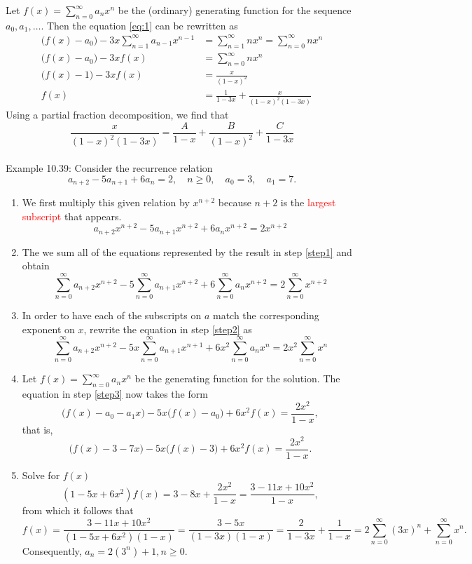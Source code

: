 \documentclass[a4paper]{article}
\begin{document}
Let $f(x)=\sum_{n=0}^{\infty}{a_nx^n}$ be the (ordinary) generating function for the sequence $a_0,a_1,\ldots$. Then the equation \ref{eq:1} can be rewritten as
\begin{align*}
    \big(f(x)-a_0\big)-3x\sum_{n=1}^{\infty}{a_{n-1}x^{n-1}}&=\sum_{n=1}^{\infty}{nx^n}=\sum_{n=0}^{\infty}{nx^n}\\
    \big(f(x)-a_0\big)-3xf(x)&=\sum_{n=0}^{\infty}{nx^n}\\
    \big(f(x)-1\big)-3xf(x)&=\frac{x}{(1-x)^2}\\
    f(x)&=\frac{1}{1-3x}+\frac{x}{(1-x)^2(1-3x)}
\end{align*}
Using a partial fraction decomposition, we find that
\begin{equation*}
    \frac{x}{(1-x)^2(1-3x)}=\frac{A}{1-x}+\frac{B}{(1-x)^2}+\frac{C}{1-3x}
\end{equation*}
\\
Example 10.39: Consider the recurrence relation
    $$
    a_{n+2}-5a_{n+1}+6a_n=2,\quad n\geq0,\quad a_0=3,\quad a_1=7.
    $$
\begin{enumerate}
    \item We first multiply this given relation by $x^{n+2}$ because $n+2$ is the \textcolor{red}{largest subscript} that appears.
    \label{step1}
    $$
    a_{n+2}x^{n+2}-5a_{n+1}x^{n+2}+6a_nx^{n+2}=2x^{n+2}
    $$
    \item The we sum all of the equations represented by the result in step \ref{step1} and obtain
    $$
    \sum_{n=0}^{\infty}{a_{n+2}x^{n+2}}-5\sum_{n=0}^{\infty}{a_{n+1}x^{n+2}}+6\sum_{n=0}^{\infty}{a_nx^{n+2}}=2\sum_{n=0}^{\infty}{x^{n+2}}
    $$
    \label{step2}
    \item In order to have each of the subscripts on $a$ match the corresponding exponent on $x$, rewrite the equation in step \ref{step2} as
    $$
    \sum_{n=0}^{\infty}{a_{n+2}x^{n+2}}-5x\sum_{n=0}^{\infty}{a_{n+1}x^{n+1}}+6x^2\sum_{n=0}^{\infty}{a_nx^{n}}=2x^2\sum_{n=0}^{\infty}{x^{n}}
    $$
    \label{step3}
    \item Let $f(x)=\sum_{n=0}^{\infty}{a_nx^n}$ be the generating function for the solution. The equation in step \ref{step3} now takes the form
    $$
    \big(f(x)-a_0-a_1x\big)-5x\big(f(x)-a_0\big)+6x^2f(x)=\frac{2x^2}{1-x},
    $$
    that is,
    $$
    \big(f(x)-3-7x\big)-5x\big(f(x)-3\big)+6x^2f(x)=\frac{2x^2}{1-x}.
    $$
    \item Solve for $f(x)$
    \begin{equation*}
        (1-5x+6x^2)f(x)=3-8x+\frac{2x^2}{1-x}=\frac{3-11x+10x^2}{1-x},
    \end{equation*}
    from which it follows that
    \begin{equation*}
        f(x)=\frac{3-11x+10x^2}{(1-5x+6x^2)(1-x)}=\frac{3-5x}{(1-3x)(1-x)}=\frac{2}{1-3x}+\frac{1}{1-x}=2\sum_{n=0}^{\infty}{(3x)^n}+\sum_{n=0}^{\infty}{x^n}.
    \end{equation*}
    Consequently, $a_n=2(3^n)+1,n\geq 0$.
\end{enumerate}
\end{document}
